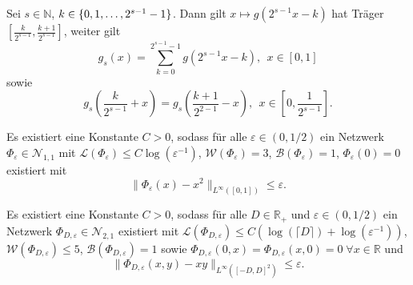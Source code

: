 \documentclass[11pt]{scrartcl}
\newcommand{\N}{\mathbb{N}} %
\newcommand{\R}{\mathbb{R}} %
\newcommand{\norm}[1]{\| #1 \|}
\begin{document}
\begin{center}
\end{center}

\begin{lemma*}
    Sei \(s\in\N\), \(k \in \{0,1,\ldots, 2^{s-1}-1\}\). Dann gilt \(x \mapsto g(2^{s-1} x - k)\) 
    hat Träger \(\left[\frac{k}{2^{s-1}}, \frac{k+1}{2^{s-1}} \right]\), weiter gilt 
    \[ g_s(x) = \sum_{k=0}^{2^{s-1}-1} g(2^{s-1}x - k),\ \ x\in [0,1] \]
    sowie 
    \[ g_s\left(\frac{k}{2^{s-1}}+x\right) = g_s\left(\frac{k+1}{2^{2-1}} - x\right), \ \ x \in \left[0, \frac{1}{2^{s-1}}\right]. \]
\end{lemma*}

\begin{proposition} %
    Es existiert eine Konstante \(C>0\), sodass für alle \(\varepsilon \in (0,1/2)\) 
    ein Netzwerk \(\Phi_\varepsilon \in \mathcal{N}_{1,1}\) mit 
    \(\mathcal{L}(\Phi_\varepsilon) \leq C\log(\varepsilon^{-1})\), 
    \(\mathcal{W}(\Phi_\varepsilon) = 3\), \(\mathcal{B}(\Phi_\varepsilon) = 1\), 
    \(\Phi_\varepsilon(0) = 0\) existiert mit 
    \[ \norm{\Phi_\varepsilon(x) - x^2 }_{L^\infty([0,1])} \leq \varepsilon. \]
\end{proposition}

\begin{proposition} %
    Es existiert eine Konstante \(C>0\), sodass für alle \(D\in \R_+\) und \(\varepsilon \in (0, 1/2)\) 
    ein Netzwerk \(\Phi_{D,\varepsilon} \in \mathcal{N}_{2,1}\) existiert mit 
    \(\mathcal{L}(\Phi_{D, \varepsilon}) \leq C (\log(\lceil D \rceil) + \log(\varepsilon^{-1})) \), 
    \(\mathcal{W}(\Phi_{D, \varepsilon}) \leq 5\), \(\mathcal{B}(\Phi_{D, \varepsilon}) = 1\) sowie 
    \(\Phi_{D,\varepsilon}(0,x) = \Phi_{D,\varepsilon}(x,0) = 0 \;\forall x\in \R\) und 
    \[ \norm{\Phi_{D,\varepsilon}(x,y) - xy}_{L^\infty([-D,D]^2)} \leq \varepsilon. \]
\end{proposition}
\end{document}
